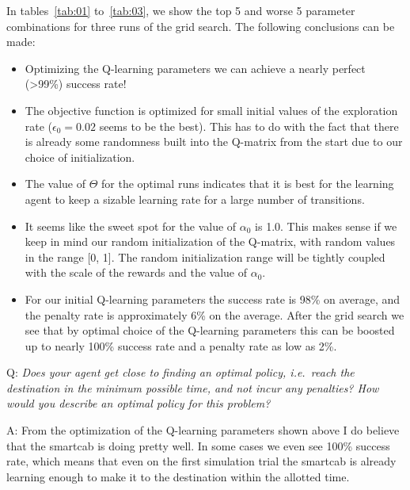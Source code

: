 \documentclass[conference]{IEEEtran}
\begin{document}
In tables~\ref{tab:01} to~\ref{tab:03}, we show the top 5 and worse 5 parameter
combinations for three runs of the grid search.  The following conclusions can
be made:
\begin{itemize}
\item Optimizing the Q-learning parameters we can achieve a nearly perfect
(>99\%) success rate! 

\item The objective function is optimized for small initial values of the
exploration rate ($\epsilon_{0}=0.02$ seems to be the best).  This has to do
with the fact that there is already some randomness built into the Q-matrix
from the start due to our choice of initialization. 

\item The value of $\Theta$ for the optimal runs indicates that it is best for
the learning agent to keep a sizable learning rate for a large number of 
transitions.  

\item It seems like the sweet spot for the value of $\alpha_{0}$ is 1.0.  
This makes sense if we keep in mind our random initialization of the
Q-matrix, with random values in the range [0, 1].  The random initialization
range will be tightly coupled with the scale of the rewards and the value of
$\alpha_0$. 

\item For our initial Q-learning parameters the success rate is 98\% on
average, and the penalty rate is approximately 6\% on the average.  After the
grid search we see that by optimal choice of the Q-learning parameters this can
be boosted up to nearly 100\% success rate and a penalty rate as low as 2\%. 

\end{itemize}
 

\vspace{1em} \noindent Q: \textit{Does your agent get close to finding an
optimal policy, i.e.\ reach the destination in the minimum possible time, and
not incur any penalties? How would you describe an optimal policy for this
problem?}

\vspace{2em} \noindent A: From the optimization of the Q-learning parameters
shown above I do believe that the smartcab is doing pretty well.  In some cases
we even see 100\% success rate, which means that even on the first simulation
trial the smartcab is already learning enough to make it to the destination
within the allotted time.
\end{document}
